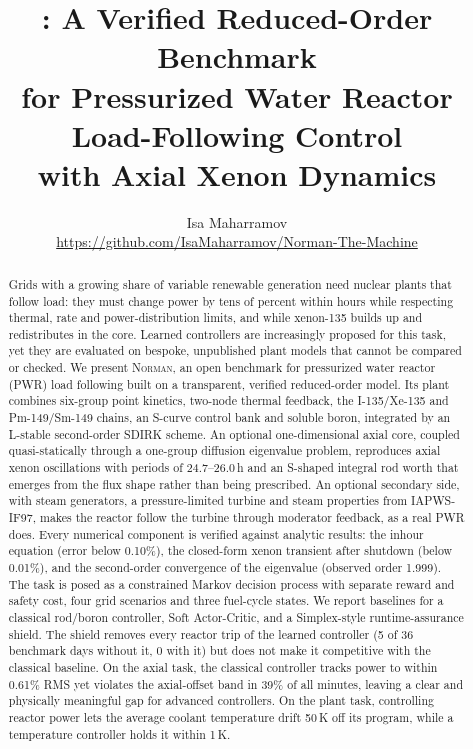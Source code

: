 \documentclass[11pt,a4paper]{article}
\title{\Norman: A Verified Reduced-Order Benchmark\\
for Pressurized Water Reactor Load-Following Control\\
with Axial Xenon Dynamics}
\author{Isa Maharramov\\[2pt]
\small\url{https://github.com/IsaMaharramov/Norman-The-Machine}}
\date{}
\newcommand{\Norman}{\textsc{Norman}}
\begin{document}
\maketitle

\begin{abstract}
Grids with a growing share of variable renewable generation need nuclear plants that
follow load: they must change power by tens of percent within hours while respecting
thermal, rate and power-distribution limits, and while xenon-135 builds up and
redistributes in the core. Learned controllers are increasingly proposed for this task,
yet they are evaluated on bespoke, unpublished plant models that cannot be compared or
checked. We present \Norman, an open benchmark for pressurized water reactor (PWR)
load following built on a transparent, verified reduced-order model. Its plant combines
six-group point kinetics, two-node thermal feedback, the I-135/Xe-135 and Pm-149/Sm-149
chains, an S-curve control bank and soluble boron, integrated by an L-stable
second-order SDIRK scheme. An optional one-dimensional axial core, coupled
quasi-statically through a one-group diffusion eigenvalue problem, reproduces axial
xenon oscillations with periods of 24.7--26.0\,h and an S-shaped
integral rod worth that emerges from the flux shape rather than being prescribed. An
optional secondary side, with steam generators, a pressure-limited turbine and steam
properties from IAPWS-IF97, makes the reactor follow the turbine through moderator
feedback, as a real PWR does.
Every numerical component is verified against analytic results: the inhour equation
(error below 0.10\%), the closed-form xenon transient after shutdown (below
0.01\%), and the second-order convergence of the eigenvalue (observed
order 1.999). The task is posed as a constrained Markov decision process with
separate reward and safety cost, four grid scenarios and three fuel-cycle states. We
report baselines for a classical rod/boron controller, Soft Actor-Critic, and a
Simplex-style runtime-assurance shield. The shield removes every reactor trip of the
learned controller (5 of 36 benchmark days without it,
0 with it) but does not make it competitive with the classical
baseline. On the axial task, the classical controller tracks power to within
0.61\% RMS yet violates the axial-offset band in 39\% of all
minutes, leaving a clear and physically meaningful gap for advanced controllers. On
the plant task, controlling reactor power lets the average coolant temperature drift
50\,K off its program, while a temperature controller holds it within 1\,K.
\end{abstract}
\end{document}
